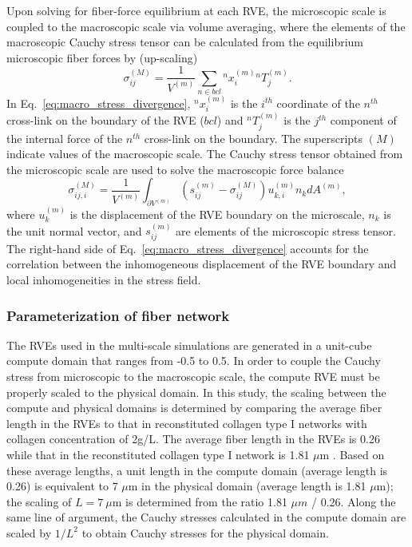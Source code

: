 \documentclass[10pt]{asme2ej}
\begin{document}
Upon solving for fiber-force equilibrium at each RVE, the microscopic scale is coupled to the macroscopic scale via volume averaging, where the elements of the macroscopic Cauchy stress tensor can be calculated from the equilibrium microscopic fiber forces by (up-scaling)\cite{Chandran:2007hy,Stylianopoulos:2007dp}
%
\begin{equation}
\sigma_{ij}^{(M)} = \frac{1}{V^{(m)}} \sum_{n \in bcl} {}^n x_i^{(m)} {}^n T_j^{(m)}.
\label{eq:macro_stress_discrete}
\end{equation}
%
In Eq.\ \eqref{eq:macro_stress_divergence}, ${}^nx_i^{(m)}$ is the $i^{th}$ coordinate of the $n^{th}$ cross-link on the boundary of the RVE ($bcl$) and ${}^nT_j^{(m)}$ is the $j^{th}$ component of the internal force of the $n^{th}$ cross-link on the boundary. The superscripts $(M)$ indicate values of the macroscopic scale. The Cauchy stress tensor obtained from the microscopic scale are used to solve the macroscopic force balance \cite{Chandran:2007hy,Stylianopoulos:2007dp}
%
\begin{equation}
\sigma_{ij,i}^{(M)} = \frac{1}{V^{(m)}} \int_{\partial V^{(m)}} \left( s_{ij}^{(m)} - \sigma_{ij}^{(M)} \right)u_{k,i}^{(m)} n_k dA^{(m)},
\label{eq:macro_stress_divergence}
\end{equation}
%
where $u_k^{(m)}$ is the displacement of the RVE boundary on the microscale, $n_k$ is the unit normal vector, and $s_{ij}^{(m)}$ are elements of the microscopic stress tensor. The right-hand side of Eq.\ \eqref{eq:macro_stress_divergence} accounts for the correlation between the inhomogeneous displacement of the RVE boundary and local inhomogeneities in the stress field. 

\subsubsection{Parameterization of fiber network}
The RVEs used in the multi-scale simulations are generated in a unit-cube compute domain that ranges from -0.5 to 0.5. In order to couple the Cauchy stress from microscopic to the macroscopic scale, the compute RVE must be properly scaled to the physical domain. In this study, the scaling between the compute and physical domains is determined by comparing the average fiber length in the RVEs to that in reconstituted collagen type I networks \cite{Lindstrom:2013gd} with collagen concentration of 2g/L. The average fiber length in the RVEs is 0.26 while that in the reconstituted collagen type I network is 1.81 $\mu$m \cite{Lindstrom:2013gd}. Based on these average lengths, a unit length in the compute  domain (average length is 0.26) is equivalent to 7 $\mu$m in the physical domain (average length is 1.81 $\mu$m); the scaling of $L=7 \ \mu$m is determined from the ratio 1.81 $\mu m$ / 0.26. Along the same line of argument, the Cauchy stresses calculated in the compute domain are scaled by $1/L^2$ to obtain Cauchy stresses for the physical domain.
\end{document}
